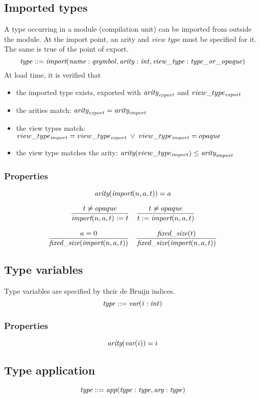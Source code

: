 \documentclass[a4paper]{report}
\newcommand\arity{{\ensuremath\textit{arity}}}
\newcommand\fixedsize{{\ensuremath\textit{fixed\_size}}}
\newcommand\tyImport{{\ensuremath\textit{import}}}
\newcommand\tyVar{{\ensuremath\textit{var}}}
\newcommand\tyApp{{\ensuremath\textit{app}}}
\begin{document}
\subsection{Imported types}
A type occurring in a module (compilation unit) can be imported from
outside the module.
At the import point, an arity and \emph{view type} must be specified for it.
The same is true of the point of export.
$$
\it type ::= \tyImport(name : qsymbol, arity : int, view\_type : type\_or\_opaque)
$$
At load time, it is verified that
\begin{itemize}
\item the imported type exists, exported with $\arity_{\it export}$
  and $view\_type_{\it export}$
\item the arities match: $\arity_{\it export} = \arity_{\it import}$
\item the view types match:\\
$view\_type_{\it import} = view\_type_{\it export} \;\lor\; view\_type_{\it import} = opaque$
\item the view type matches the arity: $\arity(view\_type_{\it import}) \le \arity_{\it import}$
\end{itemize}

\subsubsection*{Properties}
$$\arity(\tyImport(n, a, t)) = a$$

$$
{t \neq opaque
\over
\tyImport(n,a,t) := t}
\quad
{t \neq opaque
\over
t := \tyImport(n,a,t)}
$$

$$
{a=0 \over \fixedsize(\tyImport(n, a, t))}
\quad
{\fixedsize(t) \over \fixedsize(\tyImport(n, a, t))}
$$


\subsection{Type variables}
Type variables are specified by their de Bruijn indices.
$$
\it type ::= \tyVar(i : int)
$$

\subsubsection*{Properties}
$$\arity(\tyVar(i)) = i$$

\subsection{Type application}
$$
\it type ::= \tyApp(type : type, arg : type)
$$
\end{document}
